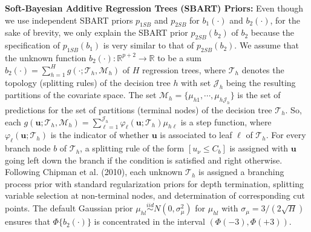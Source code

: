 \documentclass[aoas]{imsart}
\theoremstyle{plain}
\theoremstyle{definition}
\begin{document}
\textbf{ Soft-Bayesian Additive Regression Trees (SBART)  Priors:}
Even though we use independent SBART priors $p_{1SB}$ and $p_{2SB}$ for $b_1(\cdot)$ and $b_2(\cdot)$, for the sake of brevity, we only explain the SBART prior $p_{2SB}(b_2)$ of $b_2$ because the specification of $p_{1SB}(b_1)$ is very similar to that of $p_{2SB}(b_2)$. We assume that the unknown function $b_2(\cdot): \mathbb{R}^{p+2}\to \mathbb{R}$ to be a sum $b_2(\cdot) = \sum_{h=1}^{H}g(\cdot; \mathcal{T}_h, \mathcal{M}_h)$ of $H$ regression trees, where $\mathcal{T}_h$ denotes the topology (splitting rules) of the decision tree $h$ with set $\mathcal{J}_h$ being the resulting partitions of the covariate space.
The set $\mathcal{M}_h = \{\mu_{h1}, \cdots, \mu_{h \mathcal{J}_h}\}$ is the set of predictions for the set of partitions (terminal nodes) of the decision tree $\mathcal{T}_h$. 
So, each $g(\mathbf{u}; \mathcal{T}_h, {\mathcal M_h}) = \sum_{\ell=1}^{\mathcal{J}_h} \varphi_\ell(\mathbf{u}; \mathcal{T}_h) \mu_{h\ell}$ is a step function, where $\varphi_\ell(\mathbf{u}; \mathcal{T}_h)$ is the indicator of whether $\mathbf{u}$ is associated to leaf $\ell$ of $\mathcal{T}_h$. For every branch node $b$ of $\mathcal{T}_h$, a splitting rule of the form $[u_\nu \leq C_b]$ is assigned with $\mathbf{u}$ going left down the branch if the condition is satisfied and right otherwise. 
Following Chipman et al. (2010), each unknown $\mathcal{T}_h$ is assigned a branching process prior with standard  regularization priors for depth termination, splitting variable selection at non-terminal nodes, and determination of corresponding cut points. 
The default Gaussian prior $\mu_{hl} \stackrel{iid}{\sim} N(0,\sigma^2_\mu)$ for $\mu_{hl}$ with $\sigma_{\mu}=3/(2\sqrt{H})$ ensures that $\Phi\{b_2(\cdot)\}$ is concentrated in the interval $(\Phi(-3),\Phi(+3))$. 
\end{document}
